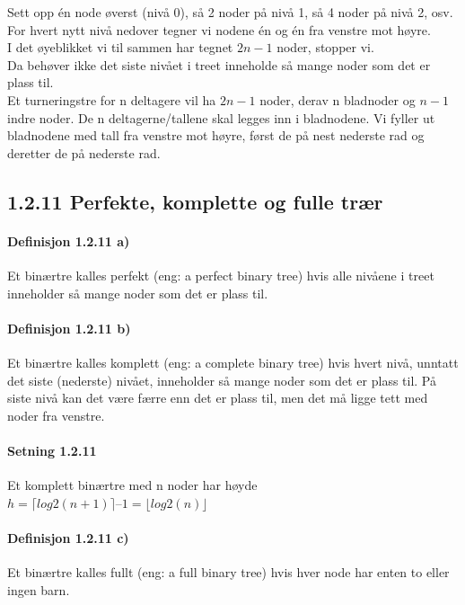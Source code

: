 \documentclass[11pt]{article}
\begin{document}
        Sett opp én node øverst (nivå 0), så 2 noder på nivå 1, så 4 noder på nivå 2, osv. \\
        For hvert nytt nivå nedover tegner vi nodene én og én fra venstre mot høyre. \\
        I det øyeblikket vi til sammen har tegnet $2n - 1$ noder, stopper vi. \\
        Da behøver ikke det siste nivået i treet inneholde så mange noder som det er plass til. \\

        Et turneringstre for n deltagere vil ha $2n - 1$ noder, derav n bladnoder og $n - 1$ indre noder.
        De n deltagerne/tallene skal legges inn i bladnodene. Vi fyller ut bladnodene med tall fra
        venstre mot høyre, først de på nest nederste rad og deretter de på nederste rad.
    
\newpage

    \subsection{1.2.11 Perfekte, komplette og fulle trær}

        \paragraph{Definisjon 1.2.11 a)} Et binærtre kalles perfekt (eng: a perfect binary tree)
        hvis alle nivåene i treet inneholder så mange noder som det er plass til.

        \paragraph{Definisjon 1.2.11 b)} Et binærtre kalles komplett (eng: a complete binary
        tree) hvis hvert nivå, unntatt det siste (nederste) nivået, inneholder så mange
        noder som det er plass til. På siste nivå kan det være færre enn det er plass til,
        men det må ligge tett med noder fra venstre.

        \paragraph{Setning 1.2.11} Et komplett binærtre med n noder har høyde  $h =\lceil log2(n+1)\rceil – 1 = \lfloor log2(n)\rfloor$

        \paragraph{Definisjon 1.2.11 c)} Et binærtre kalles fullt (eng: a full binary tree) hvis hver
        node har enten to eller ingen barn.
\end{document}
